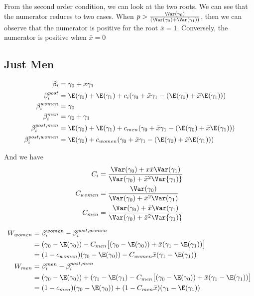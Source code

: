 From the second order condition, we can look at the two roots. We can see that the numerator reduces to two cases. When $p > \frac{\Var(\gamma_0)}{(\Var(\gamma_0) + \Var(\gamma_1))}$, then we can observe that the numerator is positive for the root $\bar{x} = 1$. Conversely, the numerator is positive when  $\bar{x} = 0$

\subsection*{Just Men}

\begin{align*}
	\beta_i &= \gamma_0 + x \gamma_1 \\
	\beta_{i}^{post} &= \E(\gamma_0) + \E(\gamma_1)  + c_i ( \gamma_0 + \bar{x} \gamma_1 - (\E(\gamma_0) + \bar{x} \E(\gamma_1))) \\
	\beta_i^{women} &= \gamma_0 \\
	\beta_i^{men} &= \gamma_0 + \gamma_1 \\
	\beta_i^{post,men} &= \E(\gamma_0) + \E(\gamma_1)  + c_{men} ( \gamma_0 + \bar{x} \gamma_1 - (\E(\gamma_0) + \bar{x} \E(\gamma_1))) \\
	\beta_i^{post, women} &= \E(\gamma_0) +  c_{women} ( \gamma_0 + \bar{x} \gamma_1 - (\E(\gamma_0) + \bar{x} \E(\gamma_1))) \\
\end{align*} 

And we have
\begin{align*}
	C_i &= \frac{\Var(\gamma_0) + x \bar{x} \Var(\gamma_1)}{\Var(\gamma_0) + \bar{x}^2 \Var{\gamma_1)}} \\
	C_{women} &= \frac{\Var(\gamma_0)}{\Var(\gamma_0) + \bar{x}^2 \Var(\gamma_1)} \\
	C_{men} &= \frac{\Var(\gamma_0) + \bar{x} \Var(\gamma_1)}{\Var(\gamma_0) + \bar{x}^2 \Var{\gamma_1)}}
\end{align*} 

\begin{align*}
	W_{women} &=  \beta_i^{women} - \beta_i^{post,women} \\
			&= (\gamma_0 - \E(\gamma_0)) - C_{men} \big[(\gamma_0 - \E(\gamma_0)) + \bar{x} ( \gamma_1 - \E(\gamma_1)) \big] \\
			&= ( 1 - c_{women}) (\gamma_0 - \E(\gamma_0)) - C_{women} \bar{x} (\gamma_1 - \E(\gamma_1)) \\
	W_{men} &=  \beta_i^{men} - \beta_i^{post,men} \\
			&= (\gamma_0 - \E(\gamma_0)) + (\gamma_1 - \E(\gamma_1) - C_{men} \big[(\gamma_0 - \E(\gamma_0)) + \bar{x} ( \gamma_1 - \E(\gamma_1)) \big] \\
			&= ( 1 - c_{men}) (\gamma_0 - \E(\gamma_0)) + (1 - C_{men} \bar{x}) (\gamma_1 - \E(\gamma_1))
\end{align*} 

